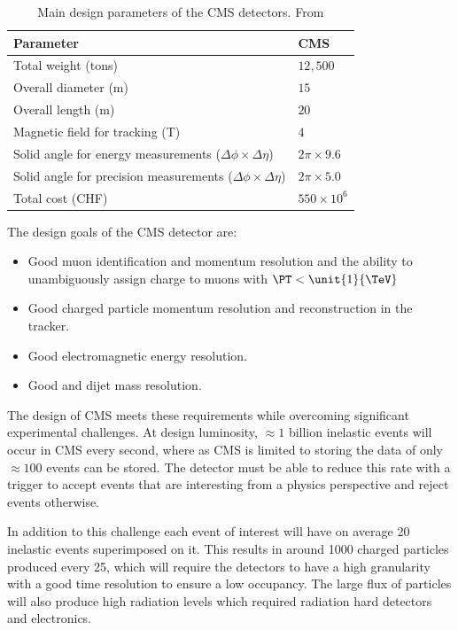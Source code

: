 \begin{table}[htbp]
\begin{center}
\begin{tabular}{ l l }
\toprule
Parameter & CMS \\
\midrule
Total weight (tons)                 & $12,500$  \\
Overall diameter (m)                & $15$  \\
Overall length (m)                  & $20$  \\
Magnetic field for tracking (T)     & $4$  \\
Solid angle for energy measurements ($\Delta\phi \times \Delta\eta$)   
                                    & $2\pi \times 9.6$  \\
Solid angle for precision measurements ($\Delta\phi \times \Delta\eta$)   
                                    & $2\pi \times 5.0$  \\
Total cost (CHF)                    & $550\times 10 ^{6}$  \\
\bottomrule
\end{tabular}
\caption{Main design parameters of the CMS detectors. From \cite{parris}}
\end{center}
\label{tab:cmsparam}
\end{table}

The design goals of the CMS detector are:\cite{tdr}
\begin{itemize}
  \item Good muon identification and momentum resolution and the ability to
unambiguously assign charge to muons with $\PT < \unit{1}{\TeV}$
  \item Good charged particle momentum resolution and reconstruction in the
tracker.
  \item Good electromagnetic energy resolution. 
  \item Good \ETmiss and dijet mass resolution.
\end{itemize}

The design of CMS meets these requirements while overcoming significant
experimental challenges.  At design luminosity, $\approx 1 $ billion inelastic
events will occur in CMS every second, where as CMS is limited to storing the
data of only $\approx 100 $ events can be stored.  The detector must be able to
reduce this rate with a trigger to accept events that are interesting from a
physics perspective and reject events otherwise.

In addition to this challenge each event of interest will have on average 20
inelastic events superimposed on it. This results in around 1000 charged
particles produced every \unit{25}{\ns}, which will require the detectors to
have a high granularity with a good time resolution to ensure a low occupancy.
The large flux of particles will also produce high radiation levels which 
required radiation hard detectors and electronics.

